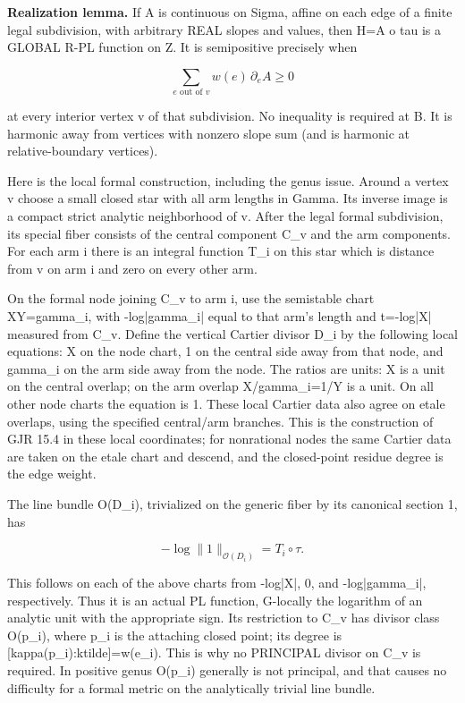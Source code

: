 \documentclass[11pt]{article}
\begin{document}
\textbf{Realization lemma.} If A is continuous on Sigma, affine on each edge of a finite legal subdivision, with arbitrary REAL slopes and values, then H=A o tau is a GLOBAL R-PL function on Z. It is semipositive precisely when

\[
\sum_{e\text{ out of }v}w(e)\,\partial_e A\ge0
\]

at every interior vertex v of that subdivision. No inequality is required at B. It is harmonic away from vertices with nonzero slope sum (and is harmonic at relative-boundary vertices).

Here is the local formal construction, including the genus issue. Around a vertex v choose a small closed star with all arm lengths in Gamma. Its inverse image is a compact strict analytic neighborhood of v. After the legal formal subdivision, its special fiber consists of the central component C\_v and the arm components. For each arm i there is an integral function T\_i on this star which is distance from v on arm i and zero on every other arm.

On the formal node joining C\_v to arm i, use the semistable chart XY=gamma\_i, with -log|gamma\_i| equal to that arm's length and t=-log|X| measured from C\_v. Define the vertical Cartier divisor D\_i by the following local equations: X on the node chart, 1 on the central side away from that node, and gamma\_i on the arm side away from the node. The ratios are units: X is a unit on the central overlap; on the arm overlap X/gamma\_i=1/Y is a unit. On all other node charts the equation is 1. These local Cartier data also agree on etale overlaps, using the specified central/arm branches. This is the construction of GJR 15.4 in these local coordinates; for nonrational nodes the same Cartier data are taken on the etale chart and descend, and the closed-point residue degree is the edge weight.

The line bundle O(D\_i), trivialized on the generic fiber by its canonical section 1, has

\[
-\log\|1\|_{\mathcal O(D_i)}=T_i\circ\tau.
\]

This follows on each of the above charts from -log|X|, 0, and -log|gamma\_i|, respectively. Thus it is an actual PL function, G-locally the logarithm of an analytic unit with the appropriate sign. Its restriction to C\_v has divisor class O(p\_i), where p\_i is the attaching closed point; its degree is [kappa(p\_i):ktilde]=w(e\_i). This is why no PRINCIPAL divisor on C\_v is required. In positive genus O(p\_i) generally is not principal, and that causes no difficulty for a formal metric on the analytically trivial line bundle.
\end{document}
